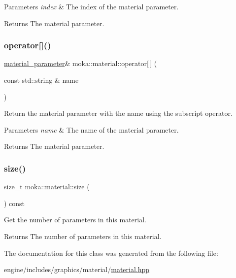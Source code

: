 \begin{DoxyParams}{Parameters}
{\em index} & The index of the material parameter. \\
\hline
\end{DoxyParams}
\begin{DoxyReturn}{Returns}
The material parameter. 
\end{DoxyReturn}
\mbox{\label{classmoka_1_1material_ae29638762c567b2a27b750c40226a0a5}} 
\subsubsection{\texorpdfstring{operator[]()}{operator[]()}\hspace{0.1cm}{\footnotesize\ttfamily [3/3]}}
{\footnotesize\ttfamily \mbox{\hyperlink{structmoka_1_1material__parameter}{material\+\_\+parameter}}\& moka\+::material\+::operator\mbox{[}$\,$\mbox{]} (\begin{DoxyParamCaption}\item[{const std\+::string \&}]{name }\end{DoxyParamCaption})}



Return the material parameter with the name using the subscript operator. 


\begin{DoxyParams}{Parameters}
{\em name} & The name of the material parameter. \\
\hline
\end{DoxyParams}
\begin{DoxyReturn}{Returns}
The material parameter. 
\end{DoxyReturn}
\mbox{\label{classmoka_1_1material_a30589855362a602a64c624d6f57fed3c}} 
\subsubsection{\texorpdfstring{size()}{size()}}
{\footnotesize\ttfamily size\+\_\+t moka\+::material\+::size (\begin{DoxyParamCaption}{ }\end{DoxyParamCaption}) const}



Get the number of parameters in this material. 

\begin{DoxyReturn}{Returns}
The number of parameters in this material. 
\end{DoxyReturn}


The documentation for this class was generated from the following file\+:\begin{DoxyCompactItemize}
\item 
engine/includes/graphics/material/\mbox{\hyperlink{material_8hpp}{material.\+hpp}}\end{DoxyCompactItemize}
